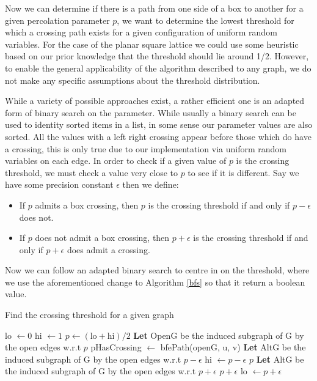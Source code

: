 \documentclass[a4paper,11pt]{article}
\theoremstyle{definition}
\begin{document}
Now we can determine if there is a path from one side of a box to another for a given percolation parameter $p$, we want to determine the lowest threshold for which a crossing path exists for a given configuration of uniform random variables. For the case of the planar square lattice we could use some heuristic based on our prior knowledge that the threshold should lie around 1/2. However, to enable the general applicability of the algorithm described to any graph, we do not make any specific assumptions about the threshold distribution.

While a variety of possible approaches exist, a rather efficient one is an adapted form of binary search on the parameter. While usually a binary search can be used to identity sorted items in a list, in some sense our parameter values are also sorted. All the values with a left right crossing appear before those which do have a crossing, this is only true due to our implementation via uniform random variables on each edge.
In order to check if a given value of $p$ is the crossing threshold, we must check a value very close to $p$ to see if it is different. Say we have some precision constant $\epsilon$ then we define:
\begin{itemize}
	\item If $p$ admits a box crossing, then $p$ is the crossing threshold if and only if $p-\epsilon$ does not.
	\item If $p$ does not admit a box crossing, then $p+\epsilon$ is the crossing threshold if and only if $p+\epsilon$ does admit a crossing.
\end{itemize}

Now we can follow an adapted binary search to centre in on the threshold, where we use the aforementioned change to Algorithm \ref*{bfs} so that it return a boolean value.

\begin{algorithm}
	\caption{Find the crossing threshold for a given graph}\label{findthreshold}
	\begin{algorithmic}[1]
	 
	\State lo $\gets 0$
	\State hi $\gets 1$
		\State $p \gets (\text{lo}+\text{hi})/2$
		\State \textbf{Let} OpenG be the induced subgraph of G by the open edges w.r.t $p$
		\State pHasCrossing $\gets $ bfePath(openG, u, v)
			\State \textbf{Let} AltG be the induced subgraph of G by the open edges w.r.t $p-\epsilon$
				\State hi $\gets p - \epsilon$
			\Else
				\Return $p$
			\EndIf
		\Else
			\State \textbf{Let} AltG be the induced subgraph of G by the open edges w.r.t $p+\epsilon$
				\Return $p +\epsilon$
			\Else
			\State lo $\gets p+\epsilon$
			\EndIf
		\EndIf
	\EndWhile
	\EndProcedure
	\end{algorithmic}
\end{algorithm}
\end{document}
